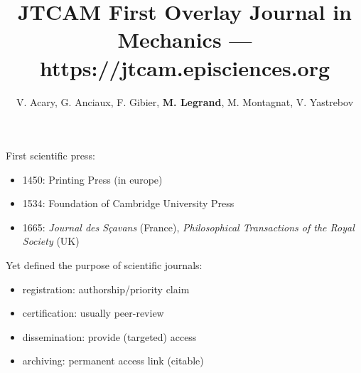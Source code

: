 \documentclass[10pt,compress,serif,aspectratio=169]{beamer}
\author[JTCAM]{V. Acary, G. Anciaux, F. Gibier, \textbf{M. Legrand}, M. Montagnat, V. Yastrebov}
\title[JTCAM]{JTCAM First Overlay Journal in Mechanics --- https://jtcam.episciences.org}
\begin{document}
\maketitle





\begin{frame}[t]%
 \vskip1cm%

{\large First scientific press:\newline}
 
 \begin{itemize}


 \item 1450: Printing Press (in europe)
 \item 1534: Foundation of Cambridge University Press
 \item 1665: \textit{Journal des Sçavans} (France), \textit{Philosophical Transactions of the Royal Society} (UK)\\
 \end{itemize}

 \vfill
{\large Yet defined the purpose of scientific journals:\newline}

\begin{itemize}
\item registration: authorship/priority claim
\item certification: usually peer-review
\item dissemination: provide (targeted) access
\item archiving: permanent access link (citable) 
\end{itemize}
\end{frame}
\end{document}
